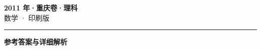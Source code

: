 \documentclass[zihao=5, a4paper]{ctexart}
\begin{document}
\begin{center}
  {\Large\bfseries 2011 年·重庆卷·理科}\\[4pt]
  {\large 数学 · 印刷版}
\end{center}
\medskip
{}

\par\bigskip\hrule\bigskip
{}
\begin{center}{\large\bfseries 参考答案与详细解析}\end{center}
\smallskip

\end{document}

